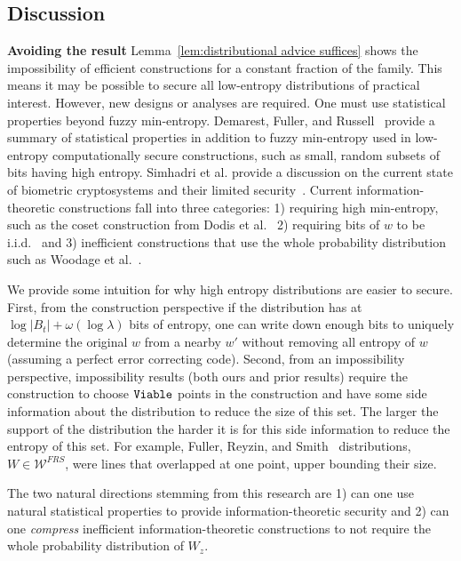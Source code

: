 \subsection{Discussion}\label{ssec:discussion}
\textbf{Avoiding the result} Lemma~\ref{lem:distributional advice suffices}  shows the impossibility of efficient constructions for a constant fraction of the family.  This means it may be possible to secure all low-entropy distributions of practical interest. However, new designs or analyses are required.  One must use statistical properties beyond fuzzy min-entropy. Demarest, Fuller, and Russell~\cite{demarest2021code} provide a summary of statistical properties in addition to fuzzy min-entropy used in low-entropy computationally secure constructions, such as small, random subsets of bits having high entropy.   Simhadri et al. provide a discussion on the current state of biometric cryptosystems and their limited security~\cite{simhadri2019cryptographic}.   Current information-theoretic constructions fall into three categories: 1) requiring high min-entropy, such as the coset construction from Dodis et al.~\cite{dodis2008fuzzy}  2) requiring bits of $w$ to be i.i.d.~\cite{Mau93,MW96,maes2009low,yu2010secure,hiller2012complementary} and 3) inefficient constructions that use the whole probability distribution such as Woodage et al.~\cite{woodage2017new}. 

We provide some intuition for why high entropy distributions are easier to secure.  First, from the construction perspective if the distribution has at  $\log{|B_t|}+\omega(\log \lambda)$ bits of entropy, one can write down enough bits to uniquely determine the original $w$ from a nearby $w'$ without removing all entropy of $w$ (assuming a perfect error correcting code). Second, from an impossibility perspective, impossibility results (both ours and prior results) require the construction to choose $\mathtt{Viable}$ points in the construction and have some side information about the distribution to reduce the size of this set.  The larger the support of the distribution the harder it is for this side information to reduce the entropy of this set.  For example, Fuller, Reyzin, and Smith~\cite{fuller2020fuzzy} distributions, $W\in\mathcal{W}^{FRS}$, were lines that overlapped at one point, upper bounding their size.

The two natural directions stemming from this research are 1) can one use natural statistical properties to provide information-theoretic security and 2) can one \emph{compress} inefficient information-theoretic constructions to not require the whole probability distribution of $W_z$.


